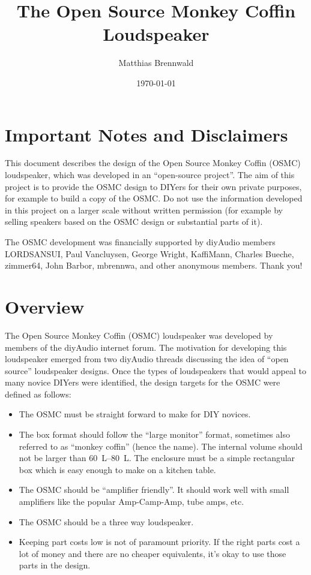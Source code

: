 \documentclass[12pt,a4paper]{article}
\title{The Open Source Monkey Coffin Loudspeaker}
\author{Matthias Brennwald}
\date{\today}
\begin{document}
\maketitle

\vspace{0.2\textheight}

\section*{Important Notes and Disclaimers}
This document describes the design of the Open Source Monkey Coffin (OSMC) loudspeaker, which was developed in an ``open-source project''\cite{osmc_p1}. The aim of this project is to provide the OSMC design to DIYers for their own private purposes, for example to build a copy of the OSMC. Do not use the information developed in this project on a larger scale without written permission (for example by selling speakers based on the OSMC design or substantial parts of it).\par

The OSMC development was financially supported by diyAudio members LORDSANSUI, Paul Vancluysen, George Wright, KaffiMann, Charles Bueche, zimmer64, John Barbor, mbrennwa, and other anonymous members. Thank you!

\clearpage

\section{Overview}
The Open Source Monkey Coffin (OSMC) loudspeaker was developed by members of the diyAudio internet forum\cite{osmc_p1}. The motivation for developing this loudspeaker emerged from two diyAudio threads discussing the idea of ``open source'' loudspeaker designs\cite{osproj1_p1,osproj2_p1}. Once the types of loudspeakers that would appeal to many novice DIYers were identified, the design targets for the OSMC were defined as follows:

\begin{itemize}
\item The OSMC must be straight forward to make for DIY novices.
\item The box format should follow the ``large monitor'' format, sometimes also referred to as ``monkey coffin'' (hence the name). The internal volume should not be larger than \SIrange{60}{80}{L}. The enclosure must be a simple rectangular box which is easy enough to make on a kitchen table.
\item The OSMC should be ``amplifier friendly''. It should work well with small amplifiers like the popular Amp-Camp-Amp, tube amps, etc.
\item The OSMC should be a three way loudspeaker.
\item Keeping part costs low is not of paramount priority. If the right parts cost a lot of money and there are no cheaper equivalents, it's okay to use those parts in the design.
\end{itemize}
\end{document}
